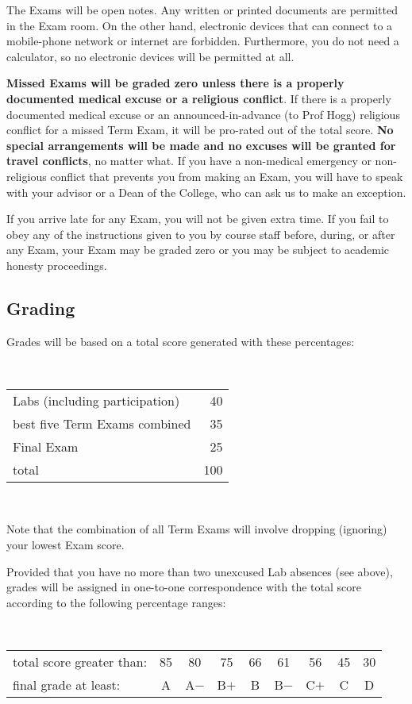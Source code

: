 \documentclass[12pt]{article}
\begin{document}
The Exams will be open notes. Any written or printed documents are
permitted in the Exam room. On the other hand, electronic devices that
can connect to a mobile-phone network or internet are
forbidden. Furthermore, you do not need a calculator, so no electronic
devices will be permitted at all.

\textbf{Missed Exams will be graded zero unless there is a properly
  documented medical excuse or a religious conflict}. If there is a
properly documented medical excuse or an announced-in-advance (to Prof
Hogg) religious conflict for a missed Term Exam, it will be pro-rated
out of the total score. \textbf{No special arrangements will be made
  and no excuses will be granted for travel conflicts}, no matter
what. If you have a non-medical emergency or non-religious conflict
that prevents you from making an Exam, you will have to speak with your
advisor or a Dean of the College, who can ask us to make an exception.

If you arrive late for any Exam, you will not be given extra time. If
you fail to obey any of the instructions given to you by course staff
before, during, or after any Exam, your Exam may be graded zero or you
may be subject to academic honesty proceedings.

\subsection*{Grading}

Grades will be based on a total score generated with these percentages:

\bigskip\noindent
~\hfill\begin{tabular}{lr}
\hline
Labs (including participation) &  40 \\
best five Term Exams combined  &  35 \\
Final Exam                     &  25 \\
\hline
total                          & 100 \\
\hline
\end{tabular}\hfill ~

\bigskip\noindent
Note that the combination of all Term Exams will involve dropping
(ignoring) your lowest Exam score.

Provided that you have no more than two unexcused Lab absences (see
above), grades will be assigned in one-to-one correspondence with the
total score according to the following percentage ranges:

\bigskip\noindent
~\hfill\begin{tabular}{lcccccccc}
\hline
total score greater than: & 85 & 80   & 75   & 66 & 61   & 56   & 45 & 30 \\
final grade at least:     & A  & A$-$ & B$+$ & B  & B$-$ & C$+$ & C  & D  \\
\hline
\end{tabular}\hfill~
\end{document}
